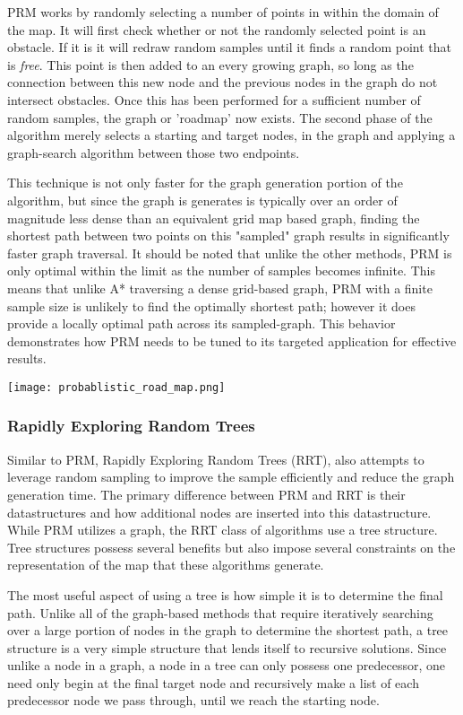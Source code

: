 PRM works by randomly selecting a number of points in within the domain of the map. It will first check whether or not the randomly selected point is an obstacle. If it is it will redraw random samples until it finds a random point that is \textit{free}. This point is then added to an every growing graph, so long as the connection between this new node and the previous nodes in the graph do not intersect obstacles. Once this has been performed for a sufficient number of random samples, the graph or 'roadmap' now exists. The second phase of the algorithm merely selects a starting and target nodes, in the graph and applying a graph-search algorithm between those two endpoints.

This technique is not only faster for the graph generation portion of the algorithm, but since the graph is generates is typically over an order of magnitude less dense than an equivalent grid map based graph, finding the shortest path between two points on this "sampled" graph results in significantly faster graph traversal. It should be noted that unlike the other methods, PRM is only optimal within the limit as the number of samples becomes infinite. This means that unlike A* traversing a dense grid-based graph, PRM with a finite sample size is unlikely to find the optimally shortest path; however it does provide a locally optimal path across its sampled-graph. This behavior demonstrates how PRM needs to be tuned to its targeted application for effective results.  

\texttt{[image: probablistic\_road\_map.png]}

\subsubsection{Rapidly Exploring Random Trees}

Similar to PRM, Rapidly Exploring Random Trees (RRT), also attempts to leverage random sampling to improve the sample efficiently and reduce the graph generation time. The primary difference between PRM and RRT is their datastructures and how additional nodes are inserted into this datastructure. While PRM utilizes a graph, the RRT class of algorithms use a tree structure. Tree structures possess several benefits but also impose several constraints on the representation of the map that these algorithms generate. 

The most useful aspect of using a tree is how simple it is to determine the final path. Unlike all of the graph-based methods that require iteratively searching over a large portion of nodes in the graph to determine the shortest path, a tree structure is a very simple structure that lends itself to recursive solutions. Since unlike a node in a graph, a node in a tree can only possess one predecessor, one need only begin at the final target node and recursively make a list of each predecessor node we pass through, until we reach the starting node. 

